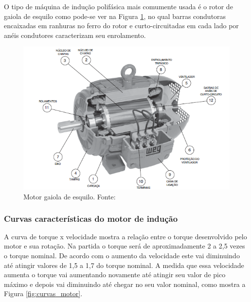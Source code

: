 O tipo de máquina de indução polifásica mais comumente usada é o rotor de gaiola de esquilo como pode-se ver na 
Figura \ref{fig:motor}, no qual barras condutoras encaixadas em ranhuras no ferro do rotor e curto-circuitadas 
em cada lado por anéis condutores caracterizam seu enrolamento. \cite{Fitzgerald}
\\
\begin{figure}[t]
\centering
\includegraphics[keepaspectratio=true,scale=0.8]{figuras/motor.png}
\caption{Motor gaiola de esquilo. Fonte:\cite{WEG}}
\label{fig:motor}

\end{figure}

\subsubsection*{\textbf{Curvas características do motor de indução}}

A curva de torque x velocidade mostra a relação entre o torque desenvolvido pelo motor e sua rotação. 
Na partida o torque será de aproximadamente 2 a 2,5 vezes o torque nominal. De acordo com o aumento da velocidade 
este vai diminuindo até atingir valores de 1,5 a 1,7 do torque nominal.\cite{WEG} A medida que essa velocidade aumenta o 
torque vai aumentando novamente até atingir seu valor de pico máximo e depois vai diminuindo até chegar no seu
valor nominal, como mostra a Figura \ref{fig:curvas_motor}.

